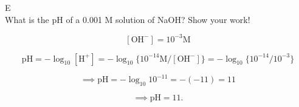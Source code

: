 \documentclass[12pt]{article}
\begin{document}
\begin{problem}{E}
\text{ }\\
What is the pH of a 0.001 M solution of NaOH? Show your work! 
\end{problem}
 
\begin{solution}
$$[\mathrm{{OH}^-}] = 10^{-3} \mathrm{M}$$

$$\mathrm{pH} = -\log_{10} \mathrm{[H^+]}
= -\log_{10} \{\mathrm{10^{-14}M/[{OH}^-]}\} = -\log_{10} \{\mathrm{10^{-14}/10^{-3}}\} $$

$$\implies \mathrm{pH} = -\log_{10} \mathrm{10^{-11}} = -(-11) = 11$$

$$\implies \boxed{\mathrm{pH} = 11.}$$
\end{solution}
\end{document}
